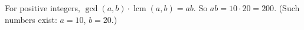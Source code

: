 For positive integers, $\gcd(a,b)\cdot\operatorname{lcm}(a,b)=ab$. So $ab=10\cdot20=\boxed{200}$. (Such numbers exist: $a=10$, $b=20$.)
